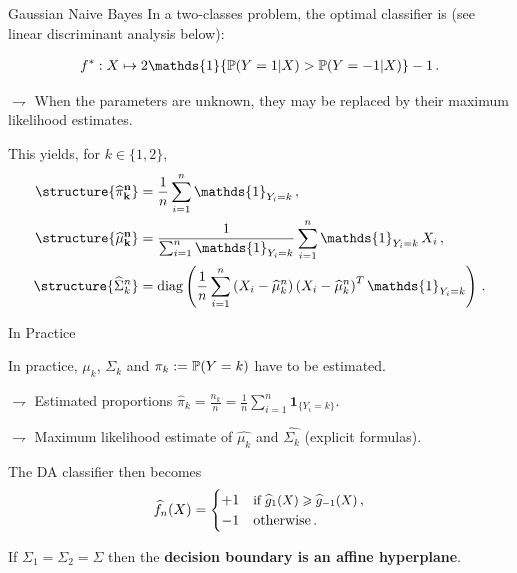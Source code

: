 \documentclass[xcolor={usenames,dvipsnames},handout]{beamer}
\begin{document}
\begin{frame}{Gaussian Naive Bayes}
In a two-classes problem, the optimal classifier is (\alert{see linear discriminant analysis below}):

\begin{align*}
f^*:X\mapsto 2\mathds{1}\{\P(Y= 1| X)>\P(Y= -1| X)\}-1\,.
\end{align*}

\vspace{.2cm}

$\rightharpoondown$ When the parameters are unknown, they may be replaced by their \alert{maximum likelihood estimates}.

This yields, for $k\in\{1,2\}$,  
\begin{align*}
\structure{{\bf \widehat \pi_k^n}} &= \frac{1}{n}\sum_{i=1}^n\mathds{1}_{Y_i=k}\,,\\
\structure{{\bf \widehat \mu_k^n}} &= \frac{1}{\sum_{i=1}^n\mathds{1}_{Y_i=k}}\sum_{i=1}^n\mathds{1}_{Y_i=k}\,X_i\,,\\
\structure{{\widehat\Sigma_k^n}} &= \mathrm{diag}\left(\frac{1}{n}\sum_{i=1}^n \left(X_i - \widehat \mu_{k}^n\right)\left(X_i - \widehat \mu_{k}^n\right)^T\mathds{1}_{Y_i=k}\right)\,.
\end{align*}

\end{frame}


\begin{frame}{In Practice}


In practice, $\mu_k$, $\Sigma_k$ and $\pi_k:=\P(Y=k)$ have to be estimated. 

$\rightharpoondown$ \alert{Estimated proportions} $ \widehat{\pi}_k =\frac{n_k}{n}= \frac{1}{n} \sum_{i=1}^n \mathbf{1}_{\{Y_i=k\}} $.


 $\rightharpoondown$ \alert{Maximum likelihood estimate} of $\widehat{\mu_k}$ and $\widehat{\Sigma_k}$ (explicit formulas).

\vspace{.4cm}

The DA classifier then becomes
  \begin{align*}
    \widehat{f}_n(X) = \begin{cases}
+1 & \text{\small if
$\widehat{g}_{1}(X)\geq\widehat{g}_{-1}(X)$}\,,
\\
-1 & \text{otherwise}\,.
    \end{cases}
  \end{align*}

\vspace{.3cm}

 If  $\Sigma_{1}=\Sigma_2 = \Sigma$ then the \alert{{\bf decision boundary is an affine hyperplane}}.

\end{frame}
\end{document}
